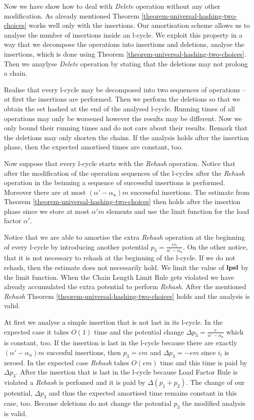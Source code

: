 \documentclass[runningheads,a4paper]{llncs}
\begin{document}
Now we have show how to deal with \emph{Delete} operation without any other modification. As already mentioned Theorem \ref{theorem-universal-hashing-two-choices} works well only with the insertions. Our amortisation scheme allows us to analyse the number of insertions inside an l-cycle. We exploit this property in a way that we decompose the operations into insertions and deletions, analyse the insertions, which is done using Theorem \ref{theorem-universal-hashing-two-choices}. Then we anaylyse \emph{Delete} operation by stating that the deletions may not prolong a chain.

Realise that every l-cycle may be decomposed into two sequences of operations -- at first the insertions are performed. Then we perform the deletions so that we obtain the set hashed at the end of the analysed l-cycle. Running times of all operations may only be worsened however the results may be different. Now we only bound their running times and do not care about their results. Remark that the deletions may only shorten the chains. If the analysis holds after the insertion phase, then the expected amortised times are constant, too.

Now suppose that every l-cycle starts with the \emph{Rehash} operation. Notice that after the modification of the operation sequences of the l-cycles after the \emph{Rehash} operation in the beinning a sequence of successful insertions is performed. Moreover there are at most $(\alpha' - \alpha_u)m$ successful insertions. The estimate from Theorem \ref{theorem-universal-hashing-two-choices} then holds after the insertion phase since we store at most $\alpha' m$ elements and use the limit function for the load factor $\alpha'$.

Notice that we are able to amortise the extra \emph{Rehash} operation at the beginning of every l-cycle by introducing another potential $p_3 = \frac{e i_l}{\alpha' - \alpha_u}$. On the other notice, that it is not necessary to rehash at the beginning of the l-cycle. If we do not rehash, then the estimate does not necessarily hold. We limit the value of $\mathbf{lpsl}$ by the limit function. When the Chain Length Limit Rule gets violated we have already accumulated the extra potential to perform \emph{Rehash}. After the mentioned \emph{Rehash} Theorem \ref{theorem-universal-hashing-two-choices} holds and the analysis is valid.

At first we analyse a simple insertion that is not last in its l-cycle. In the expected case it takes $O(1)$ time and the potential change $\Delta p_3 = \frac{e}{\alpha' - \alpha_u}$ which is constant, too. If the insertion is last in the l-cycle because there are exactly $(\alpha' - \alpha_u)m$ succesful insertions, then $p_3 = em$ and $\Delta p_3 = -em$ since $i_l$ is zeroed. In the expected case \emph{Rehash} takes $O(em)$ time and this time is paid by $\Delta p_3$. After the insertion that is last in the l-cycle because Load Factor Rule is violated a \emph{Rehash} is perfomed and it is paid by $\Delta (p_1 + p_2)$. The change of our potential, $\Delta p_3$ and thus the expected amortised time remains constant in this case, too. Because deletions do not change the potential $p_3$ the modified analysis is valid.
\end{document}
